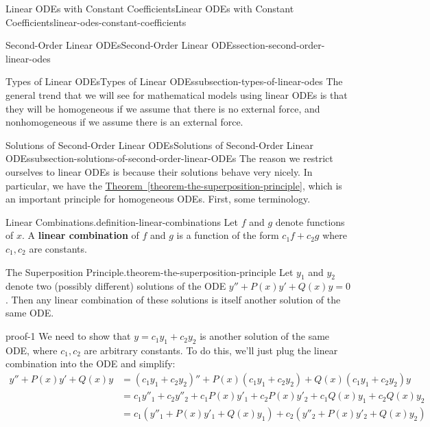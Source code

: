 \documentclass[oneside,10pt,]{book}
\newcommand{\terminology}[1]{\textbf{#1}}
\numberwithin{equation}{section}
\newcommand{\amp}{&}
\begin{document}
\begin{chapterptx}{Linear ODEs with Constant Coefficients}{}{Linear ODEs with Constant Coefficients}{}{}{linear-odes-constant-coefficients}
\begin{sectionptx}{Second-Order Linear ODEs}{}{Second-Order Linear ODEs}{}{}{section-second-order-linear-odes}
\begin{subsectionptx}{Types of Linear ODEs}{}{Types of Linear ODEs}{}{}{subsection-types-of-linear-odes}
\hypertarget{p-153}{}%
The general trend that we will see for mathematical models using linear ODEs is that they will be homogeneous if we assume that there is no external force, and nonhomogeneous if we assume there is an external force.%
\end{subsectionptx}
%
%
\typeout{************************************************}
\typeout{************************************************}
%
\begin{subsectionptx}{Solutions of Second-Order Linear ODEs}{}{Solutions of Second-Order Linear ODEs}{}{}{subsection-solutions-of-second-order-linear-ODEs}
\hypertarget{p-154}{}%
The reason we restrict ourselves to linear ODEs is because their solutions behave very nicely. In particular, we have the \hyperref[theorem-the-superposition-principle]{Theorem~\ref{theorem-the-superposition-principle}}, which is an important principle for homogeneous ODEs. First, some terminology.%
\begin{definition}{Linear Combinations.}{definition-linear-combinations}%
\hypertarget{p-155}{}%
Let \(f\) and \(g\) denote functions of \(x\). A \terminology{linear combination} of \(f\) and \(g\) is a function of the form \(c_{1}f+c_{2}g\) where \(c_{1},c_{2}\) are constants.%
\end{definition}
\begin{theorem}{The Superposition Principle.}{}{theorem-the-superposition-principle}%
\hypertarget{p-156}{}%
Let \(y_{1}\) and \(y_{2}\) denote two (possibly different) solutions of the ODE \(y''+P(x)y'+Q(x)y = 0\). Then any linear combination of these solutions is itself another solution of the same ODE.%
\end{theorem}
\begin{proofptx}{}{proof-1}
\hypertarget{p-157}{}%
We need to show that \(y = c_{1}y_{1} + c_{2}y_{2}\) is another solution of the same ODE, where \(c_{1},c_{2}\) are arbitrary constants. To do this, we'll just plug the linear combination into the ODE and simplify:%
\begin{align*}
y''+P(x)y'+Q(x)y \amp = (c_{1}y_{1}+c_{2}y_{2})''+P(x)(c_{1}y_{1}+c_{2}y_{2})+Q(x)(c_{1}y_{1}+c_{2}y_{2})y \\
\amp = c_{1}y''_{1}+c_{2}y''_{2} + c_{1}P(x)y'_{1}+c_{2}P(x)y'_{2} + c_{1}Q(x)y_{1} + c_{2}Q(x)y_{2}\\
\amp = c_{1}(y''_{1}+P(x)y'_{1}+Q(x)y_{1}) + c_{2}(y''_{2}+P(x)y'_{2}+Q(x)y_{2}) \\

\end{align*}
\end{proofptx}
\end{subsectionptx}
\end{sectionptx}
\end{chapterptx}
\end{document}
